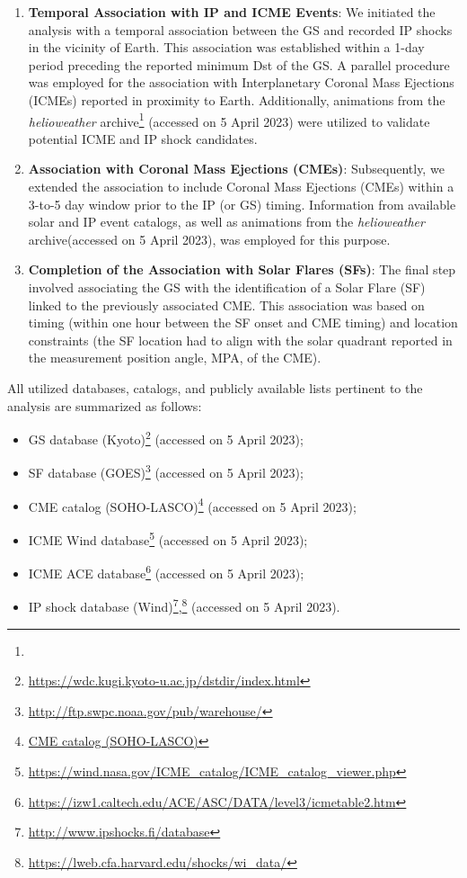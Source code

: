 \begin{enumerate}
	\item \textbf{Temporal Association with IP and ICME Events}:
	We initiated the analysis with a temporal association between the GS and recorded IP shocks in the vicinity of Earth. This association was established within a 1-day period preceding the reported minimum Dst of the GS. A parallel procedure was employed for the association with Interplanetary Coronal Mass Ejections (ICMEs) reported in proximity to Earth. Additionally, animations from the \textit{helioweather} archive\footnote{\helioweatherurl} (accessed on 5 April 2023) were utilized to validate potential ICME and IP shock candidates.
	
	\item \textbf{Association with Coronal Mass Ejections (CMEs)}:
	Subsequently, we extended the association to include Coronal Mass Ejections (CMEs) within a 3-to-5 day window prior to the IP (or GS) timing. Information from available solar and IP event catalogs, as well as animations from the \textit{helioweather} archive\footnotemark[\value{footnote}] (accessed on 5 April 2023), was employed for this purpose.
	
	\item \textbf{Completion of the Association with Solar Flares (SFs)}:
	The final step involved associating the GS with the identification of a Solar Flare (SF) linked to the previously associated CME. This association was based on timing (within one hour between the SF onset and CME timing) and location constraints (the SF location had to align with the solar quadrant reported in the measurement position angle, MPA, of the CME).
\end{enumerate}

All utilized databases, catalogs, and publicly available lists pertinent to the analysis are summarized as follows:

\begin{itemize}
	\item GS database (Kyoto)\footnote{\url{https://wdc.kugi.kyoto-u.ac.jp/dstdir/index.html}} (accessed on 5 April 2023);
	\item SF database (GOES)\footnote{\url{http://ftp.swpc.noaa.gov/pub/warehouse/}} (accessed on 5 April 2023);
	\item CME catalog (SOHO-LASCO)\footnote{\url{CME catalog (SOHO-LASCO)}} (accessed on 5 April 2023);
	\item ICME Wind database\footnote{\url{https://wind.nasa.gov/ICME_catalog/ICME_catalog_viewer.php}} (accessed on 5 April 2023);
	\item ICME ACE database\footnote{\url{https://izw1.caltech.edu/ACE/ASC/DATA/level3/icmetable2.htm}} (accessed on 5 April 2023);
	\item IP shock database (Wind)\footnote{\url{http://www.ipshocks.fi/database}},\footnote{\url{https://lweb.cfa.harvard.edu/shocks/wi_data/}} (accessed on 5 April 2023).
\end{itemize}

